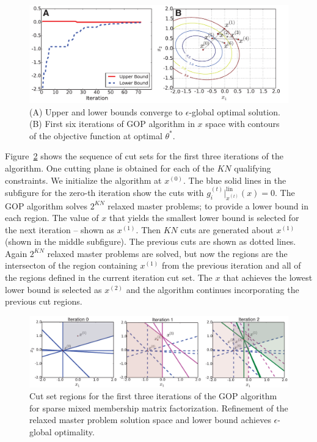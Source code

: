 \documentclass[11pt]{article}
\begin{document}
\begin{figure}[ht]
	\centering
		\includegraphics[width=1.0\textwidth]{figs/bounds_and_trace.pdf}
	\caption{(A) Upper and lower bounds converge to $\epsilon$-global optimal solution. (B) First six iterations of GOP algorithm in $x$ space with contours of the objective function at optimal $\theta^*$.}
	\label{fig:figs_bounds_and_trace}
\end{figure}

Figure~\ref{fig:figs_GOP_cutting_plane_sequence} shows the sequence of cut sets for the first three iterations of the algorithm. 
One cutting plane is obtained for each of the $KN$ qualifying constraints. 
We initialize the algorithm at $x^{(0)}$. 
The blue solid lines in the subfigure for the zero-th iteration show the cuts with $g^{(t)}_i\big\vert^{\text{lin}}_{x^{(t)}}(x) = 0$. The GOP algorithm solves $2^{KN}$ relaxed master
problems; to provide a lower bound in each region. 
The value of $x$ that yields the smallest lower bound is selected for the next iteration -- shown as $x^{(1)}$. 
Then $KN$ cuts are generated about $x^{(1)}$ (shown in the middle subfigure). 
The previous cuts are shown as dotted lines. Again $2^{KN}$ relaxed master problems are solved, but now the regions are the intersecton of the region containing $x^{(1)}$ from the previous iteration and all of the regions defined in the current iteration cut set. 
The $x$ that achieves the lowest lower bound is selected as $x^{(2)}$ and the algorithm continues incorporating the previous cut regions.

\begin{figure}[ht]
	\centering
		\includegraphics[width=1.0\textwidth]{figs/GOP_cutting_plane_sequence.pdf}
	\caption{Cut set regions for the first three iterations of the GOP algorithm for sparse mixed membership matrix factorization. Refinement of the relaxed master problem solution space and lower bound achieves $\epsilon$-global optimality.}
	\label{fig:figs_GOP_cutting_plane_sequence}
\end{figure}
\end{document}
